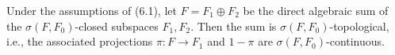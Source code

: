 Under the assumptions of (6.1), let $F = F_1 \oplus F_2$ be the direct algebraic sum of the $\sigma(F, F_0)$-closed subspaces $F_1, F_2$. Then the sum is $\sigma(F, F_0)$-topological, i.e., the associated projections $\pi : F \rightarrow F_1$ and $1 - \pi$ are $\sigma(F, F_0)$-continuous.
